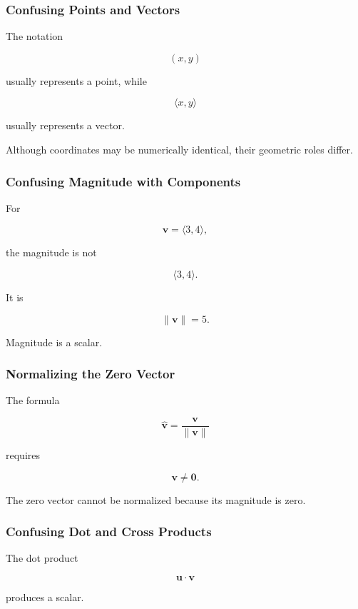 \subsubsection{Confusing Points and Vectors}

The notation

\[ (x,y) \]

usually represents a point, while

\[ \langle x,y\rangle \]

usually represents a vector.

Although coordinates may be numerically identical, their geometric roles
differ.

\subsubsection{Confusing Magnitude with Components}

For

\[ \mathbf{v}=\langle3,4\rangle, \]

the magnitude is not

\[ \langle3,4\rangle. \]

It is

\[ \|\mathbf{v}\|=5. \]

Magnitude is a scalar.

\subsubsection{Normalizing the Zero Vector}

The formula

\[ \widehat{\mathbf{v}}=\frac{\mathbf{v}}{\|\mathbf{v}\|} \]

requires

\[ \mathbf{v}\neq\mathbf{0}. \]

The zero vector cannot be normalized because its magnitude is zero.

\subsubsection{Confusing Dot and Cross Products}

The dot product

\[ \mathbf{u}\cdot\mathbf{v} \]

produces a scalar.

